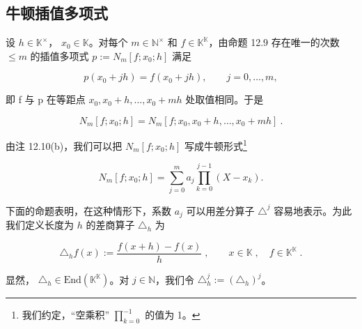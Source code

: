 \subsection*{牛顿插值多项式}

设  $ h \in \mathbb{K}^\times $， $ x_0 \in \mathbb{K} $。对每个  $ m \in \mathbb{N}^\times $ 和  $ f \in \mathbb{K}^{\mathbb{K}} $，由命题 12.9 存在唯一的次数  $ \leq m $ 的插值多项式  $ p := N_m[f; x_0; h] $ 满足

\[
p(x_{0}+j h)=f(x_{0}+j h),\qquad j=0,\ldots,m,
\]

即 f 与 p 在等距点  $ x_{0}, x_{0} + h, \ldots, x_{0} + mh $ 处取值相同。于是

\[
N_{m}[f;x_{0};h]=N_{m}[f;x_{0},x_{0}+h,\ldots,x_{0}+m h]~.
\]

由注 12.10(b)，我们可以把  $ N_{m}[f; x_{0}; h] $ 写成牛顿形式\footnote{我们约定，“空乘积” $ \prod_{k=0}^{-1} $ 的值为 1。}

\[
N_{m}[f;x_{0};h]=\sum_{j=0}^{m}a_{j}\prod_{k=0}^{j-1}(X-x_{k}).
\]

下面的命题表明，在这种情形下，系数  $ a_j $ 可以用差分算子  $ \triangle^j $ 容易地表示。为此我们定义长度为  $ h $ 的差商算子  $ \triangle_h $ 为

\[
\triangle_{h} f(x):=\frac{f(x+h)-f(x)}{h}\;,\qquad x\in\mathbb{K}\;,\quad f\in\mathbb{K}^{\mathbb{K}}\;.
\]

显然， $ \triangle_h \in \mathrm{End}(\mathbb{K}^{\mathbb{K}}) $。对  $ j \in \mathbb{N} $，我们令  $ \triangle_h^j := (\triangle_h)^j $。

